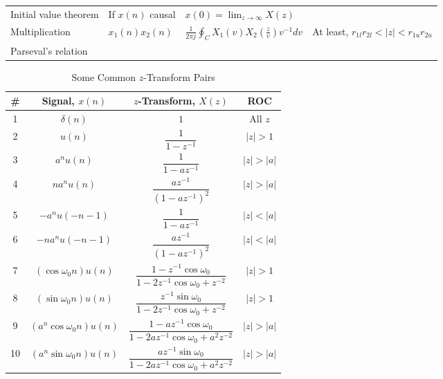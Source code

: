 \documentclass[12pt,a4paper]{article}
\begin{document}
\begin{table}[H]
{\begin{tabular}{>{\raggedright\arraybackslash}p{3.0cm}>{\raggedright\arraybackslash}p{3.4cm}>{\raggedright\arraybackslash}p{4.5cm}>{\raggedright\arraybackslash}p{4.3cm}}
Initial value theorem & If $x(n)$ causal & $x(0) = \lim_{z \to \infty} X(z)$ & \\[2pt]
Multiplication & $x_1(n)x_2(n)$ & $\frac{1}{2\pi j}\oint_C X_1(v)X_2\left(\frac{z}{v}\right)v^{-1}dv$ & At least, $r_{1l}r_{2l} < |z| < r_{1u}r_{2u}$ \\[4pt]
Parseval's relation & \multicolumn{2}{l}{$\displaystyle\sum_{n=-\infty}^{\infty} x_1(n)x_2^*(n) = \frac{1}{2\pi j}\oint_C X_1(v)X_2^*(1/v^*)v^{-1}dv$} & \\[6pt]
\hline
\end{tabular}
}
\end{table}

\newpage

\begin{table}[H]
\centering
\caption{Some Common $z$-Transform Pairs}
\label{tab:z_pairs}
\renewcommand{\arraystretch}{1.3}
\begin{tabular}{cccc}
\hline
\rule[-1.5ex]{0pt}{4.2ex}\textbf{\#} & \textbf{Signal, $x(n)$} & \textbf{$z$-Transform, $X(z)$} & \textbf{ROC} \\
\hline
\rule[-1.8ex]{0pt}{4.5ex}1 & $\delta(n)$ & $1$ & All $z$ \\
\rule[-3.2ex]{0pt}{7.0ex}2 & $u(n)$ & $\dfrac{1}{1 - z^{-1}}$ & $|z| > 1$ \\
\rule[-3.2ex]{0pt}{7.0ex}3 & $a^n u(n)$ & $\dfrac{1}{1 - az^{-1}}$ & $|z| > |a|$ \\
\rule[-3.2ex]{0pt}{7.0ex}4 & $na^n u(n)$ & $\dfrac{az^{-1}}{(1 - az^{-1})^2}$ & $|z| > |a|$ \\
\rule[-3.2ex]{0pt}{7.0ex}5 & $-a^n u(-n - 1)$ & $\dfrac{1}{1 - az^{-1}}$ & $|z| < |a|$ \\
\rule[-3.2ex]{0pt}{7.0ex}6 & $-na^n u(-n - 1)$ & $\dfrac{az^{-1}}{(1 - az^{-1})^2}$ & $|z| < |a|$ \\
\rule[-3.2ex]{0pt}{7.0ex}7 & $(\cos\omega_0 n)u(n)$ & $\dfrac{1 - z^{-1}\cos\omega_0}{1 - 2z^{-1}\cos\omega_0 + z^{-2}}$ & $|z| > 1$ \\
\rule[-3.2ex]{0pt}{7.0ex}8 & $(\sin\omega_0 n)u(n)$ & $\dfrac{z^{-1}\sin\omega_0}{1 - 2z^{-1}\cos\omega_0 + z^{-2}}$ & $|z| > 1$ \\
\rule[-3.2ex]{0pt}{7.0ex}9 & $(a^n \cos\omega_0 n)u(n)$ & $\dfrac{1 - az^{-1}\cos\omega_0}{1 - 2az^{-1}\cos\omega_0 + a^2 z^{-2}}$ & $|z| > |a|$ \\
\rule[-3.2ex]{0pt}{7.0ex}10 & $(a^n \sin\omega_0 n)u(n)$ & $\dfrac{az^{-1}\sin\omega_0}{1 - 2az^{-1}\cos\omega_0 + a^2 z^{-2}}$ & $|z| > |a|$ \\
\hline
\end{tabular}
\end{table}
\end{document}
